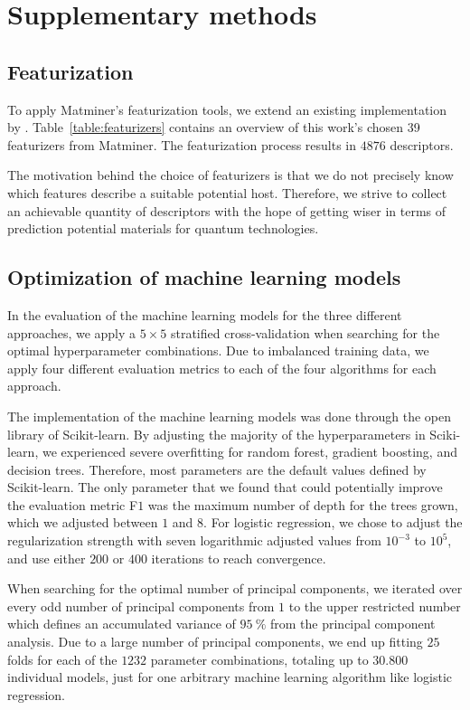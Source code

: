 \documentclass[superscriptaddress,unsortedaddress,
 amsmath,amssymb,
 aps,
]{revtex4-2}
\begin{document}
\newpage 

\section*{Supplementary methods}
\subsection*{Featurization}
To apply Matminer's featurization tools, we extend an existing implementation by \citeauthor{Breuck2021} \cite{Breuck2021}. 
Table~\ref{table:featurizers} contains an overview of this work's chosen 39 featurizers from Matminer. The featurization process results in $4876$ descriptors. 

The motivation behind the choice of featurizers is that we do not precisely know which features describe a suitable potential host. Therefore, we strive to collect an achievable quantity of descriptors with the hope of getting wiser in terms of prediction potential materials for quantum technologies. 




\subsection*{Optimization of machine learning models}

In the evaluation of the machine learning models for the three different approaches, we apply a $5\times 5$ stratified cross-validation when searching for the optimal hyperparameter combinations. Due to imbalanced training data, we apply four different evaluation metrics to each of the four algorithms for each approach. 

The implementation of the machine learning models was done through the open library of Scikit-learn. By adjusting the majority of the hyperparameters in Sciki-learn, we experienced severe overfitting for random forest, gradient boosting, and decision trees. Therefore, most parameters are the default values defined by Scikit-learn. The only parameter that we found that could potentially improve the evaluation metric F$1$ was the maximum number of depth for the trees grown, which we adjusted between $1$ and $8$. For logistic regression, we chose to adjust the regularization strength with seven logarithmic adjusted values from $10^{-3}$ to $10^{5}$, and use either $200$ or $400$ iterations to reach convergence. 

When searching for the optimal number of principal components, we iterated over every odd number of principal components from $1$ to the upper restricted number which defines an accumulated variance of $95 \ \%$ from the principal component analysis. Due to a large number of principal components, we end up fitting $25$ folds for each of the $1232$ parameter combinations, totaling up to $30.800$ individual models, just for one arbitrary machine learning algorithm like logistic regression. 
\end{document}

